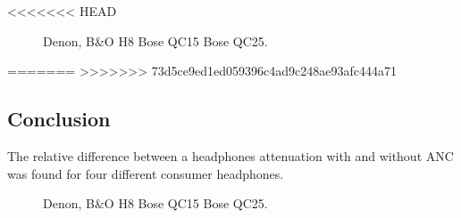<<<<<<< HEAD
\begin{figure}[H]
	\centering
	
	\caption{Denon, B\&O H8 Bose QC15 Bose QC25.}
	\label{fig:OtherBrandsTestCompare}
\end{figure}
=======
%	
>>>>>>> 73d5ce9ed1ed059396c4ad9c248ae93afc444a71

\subsection{Conclusion}
The relative difference between a headphones attenuation with and without ANC was found for four different consumer headphones.


\begin{figure}[H]
	\centering
	
	\caption{Denon, B\&O H8 Bose QC15 Bose QC25.}
	\label{fig:OtherBrandsTestCompare}
\end{figure}



